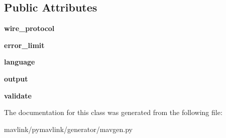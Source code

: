\subsection*{Public Attributes}
\begin{DoxyCompactItemize}
\item 
\mbox{\label{classpymavlink_1_1generator_1_1mavgen_1_1Opts_af1a93e2fc4904c4e01985743105599f3}} 
{\bfseries wire\+\_\+protocol}
\item 
\mbox{\label{classpymavlink_1_1generator_1_1mavgen_1_1Opts_aa2928bf27412e4e9c0e58c74268321d1}} 
{\bfseries error\+\_\+limit}
\item 
\mbox{\label{classpymavlink_1_1generator_1_1mavgen_1_1Opts_ae98d3c4280d0f15292776a6ad5b3fc0b}} 
{\bfseries language}
\item 
\mbox{\label{classpymavlink_1_1generator_1_1mavgen_1_1Opts_aa171d220e26278a358d1808fe78e4a55}} 
{\bfseries output}
\item 
\mbox{\label{classpymavlink_1_1generator_1_1mavgen_1_1Opts_a44cf03993910729c1748cce06e909e06}} 
{\bfseries validate}
\end{DoxyCompactItemize}


The documentation for this class was generated from the following file\+:\begin{DoxyCompactItemize}
\item 
mavlink/pymavlink/generator/mavgen.\+py\end{DoxyCompactItemize}
